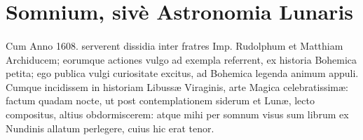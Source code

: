 \documentclass[a4paper, 11pt, oneside, polutonikogreek, german]{article}
\begin{document}
\section{Somnium, sivè Astronomia Lunaris}
\paragraph{}
Cum Anno 1608. serverent dissidia inter fratres Imp. Rudolphum et Matthiam Archiducem; eorumque actiones vulgo ad exempla referrent, ex historia Bohemica petita; ego publica vulgi curiositate excitus, ad Bohemica legenda animum appuli. Cumque incidissem in historiam Libussæ Viraginis, arte Magica celebratissimæ: factum quadam nocte, ut post contemplationem siderum et Lunæ, lecto compositus, altius obdormiscerem: atque mihi per somnum visus sum librum ex Nundinis allatum perlegere, cuius hic erat tenor.
\end{document}
